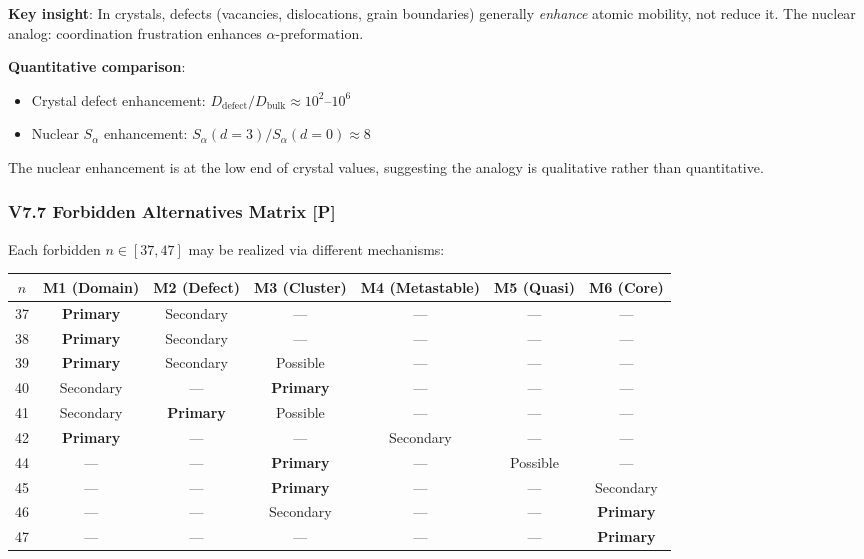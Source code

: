 \textbf{Key insight}: In crystals, defects (vacancies, dislocations, grain boundaries) generally \emph{enhance} atomic mobility, not reduce it. The nuclear analog: coordination frustration enhances $\alpha$-preformation.

\textbf{Quantitative comparison}:
\begin{itemize}
    \item Crystal defect enhancement: $D_{\text{defect}}/D_{\text{bulk}} \approx 10^2$--$10^6$
    \item Nuclear $S_\alpha$ enhancement: $S_\alpha(d=3)/S_\alpha(d=0) \approx 8$
\end{itemize}
The nuclear enhancement is at the low end of crystal values, suggesting the analogy is qualitative rather than quantitative.

\subsubsection{V7.7 Forbidden Alternatives Matrix [P]}
\label{subsubsec:v77-forbidden}

Each forbidden $n \in [37, 47]$ may be realized via different mechanisms:

\begin{center}
\small
\begin{tabular}{ccccccc}
\hline
$n$ & M1 (Domain) & M2 (Defect) & M3 (Cluster) & M4 (Metastable) & M5 (Quasi) & M6 (Core) \\
\hline
37 & \textbf{Primary} & Secondary & --- & --- & --- & --- \\
38 & \textbf{Primary} & Secondary & --- & --- & --- & --- \\
39 & \textbf{Primary} & Secondary & Possible & --- & --- & --- \\
40 & Secondary & --- & \textbf{Primary} & --- & --- & --- \\
41 & Secondary & \textbf{Primary} & Possible & --- & --- & --- \\
42 & \textbf{Primary} & --- & --- & Secondary & --- & --- \\
44 & --- & --- & \textbf{Primary} & --- & Possible & --- \\
45 & --- & --- & \textbf{Primary} & --- & --- & Secondary \\
46 & --- & --- & Secondary & --- & --- & \textbf{Primary} \\
47 & --- & --- & --- & --- & --- & \textbf{Primary} \\
\hline
\end{tabular}
\end{center}

